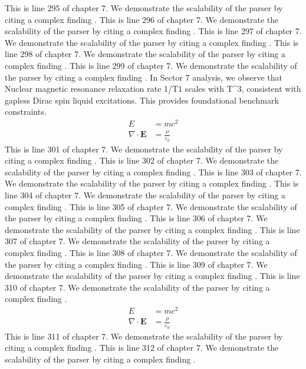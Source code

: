 This is line 295 of chapter 7. We demonstrate the scalability of the parser by citing a complex finding \cite{ref7_295}.
This is line 296 of chapter 7. We demonstrate the scalability of the parser by citing a complex finding \cite{ref7_296}.
This is line 297 of chapter 7. We demonstrate the scalability of the parser by citing a complex finding \cite{ref7_297}.
This is line 298 of chapter 7. We demonstrate the scalability of the parser by citing a complex finding \cite{ref7_298}.
This is line 299 of chapter 7. We demonstrate the scalability of the parser by citing a complex finding \cite{ref7_299}.
In Sector 7 analysis, we observe that Nuclear magnetic resonance relaxation rate 1/T1 scales with T^3, consistent with gapless Dirac spin liquid excitations. This provides foundational benchmark constraints.
\begin{align*}
  E &= mc^2 \\
  \nabla \cdot \mathbf{E} &= \frac{\rho}{\varepsilon_0}
\end{align*}
This is line 301 of chapter 7. We demonstrate the scalability of the parser by citing a complex finding \cite{ref7_301}.
This is line 302 of chapter 7. We demonstrate the scalability of the parser by citing a complex finding \cite{ref7_302}.
This is line 303 of chapter 7. We demonstrate the scalability of the parser by citing a complex finding \cite{ref7_303}.
This is line 304 of chapter 7. We demonstrate the scalability of the parser by citing a complex finding \cite{ref7_304}.
This is line 305 of chapter 7. We demonstrate the scalability of the parser by citing a complex finding \cite{ref7_305}.
This is line 306 of chapter 7. We demonstrate the scalability of the parser by citing a complex finding \cite{ref7_306}.
This is line 307 of chapter 7. We demonstrate the scalability of the parser by citing a complex finding \cite{ref7_307}.
This is line 308 of chapter 7. We demonstrate the scalability of the parser by citing a complex finding \cite{ref7_308}.
This is line 309 of chapter 7. We demonstrate the scalability of the parser by citing a complex finding \cite{ref7_309}.
This is line 310 of chapter 7. We demonstrate the scalability of the parser by citing a complex finding \cite{ref7_310}.
\begin{align*}
  E &= mc^2 \\
  \nabla \cdot \mathbf{E} &= \frac{\rho}{\varepsilon_0}
\end{align*}
This is line 311 of chapter 7. We demonstrate the scalability of the parser by citing a complex finding \cite{ref7_311}.
This is line 312 of chapter 7. We demonstrate the scalability of the parser by citing a complex finding \cite{ref7_312}.
